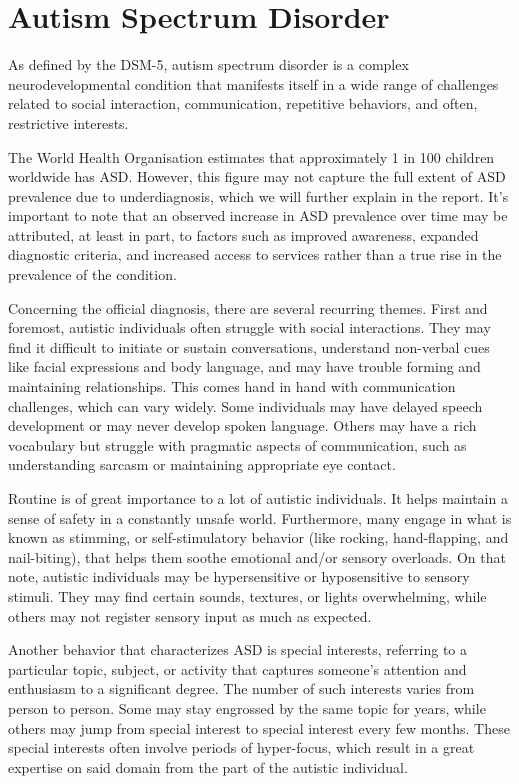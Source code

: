 \section{Autism Spectrum Disorder}

As defined by the DSM-5, autism spectrum disorder is a complex neurodevelopmental condition that manifests itself in a wide range of challenges related to social interaction, communication, repetitive behaviors, and often, restrictive interests.

The World Health Organisation estimates that approximately 1 in 100 children worldwide has ASD. However, this figure may not capture the full extent of ASD prevalence due to underdiagnosis, which we will further explain in the report. It's important to note that an observed increase in ASD prevalence over time may be attributed, at least in part, to factors such as improved awareness, expanded diagnostic criteria, and increased access to services rather than a true rise in the prevalence of the condition.

Concerning the official diagnosis, there are several recurring themes. First and foremost, autistic individuals often struggle with social interactions. They may find it difficult to initiate or sustain conversations, understand non-verbal cues like facial expressions and body language, and may have trouble forming and maintaining relationships. This comes hand in hand with communication challenges, which can vary widely. Some individuals may have delayed speech development or may never develop spoken language. Others may have a rich vocabulary but struggle with pragmatic aspects of communication, such as understanding sarcasm or maintaining appropriate eye contact.

Routine is of great importance to a lot of autistic individuals. It helps maintain a sense of safety in a constantly unsafe world. Furthermore, many engage in what is known as stimming, or self-stimulatory behavior (like rocking, hand-flapping, and nail-biting), that helps them soothe emotional and/or sensory overloads. On that note, autistic individuals may be hypersensitive or hyposensitive to sensory stimuli. They may find certain sounds, textures, or lights overwhelming, while others may not register sensory input as much as expected.

Another behavior that characterizes ASD is special interests, referring to a particular topic, subject, or activity that captures someone's attention and enthusiasm to a significant degree. The number of such interests varies from person to person. Some may stay engrossed by the same topic for years, while others may jump from special interest to special interest every few months. These special interests often involve periods of hyper-focus, which result in a great expertise on said domain from the part of the autistic individual.

